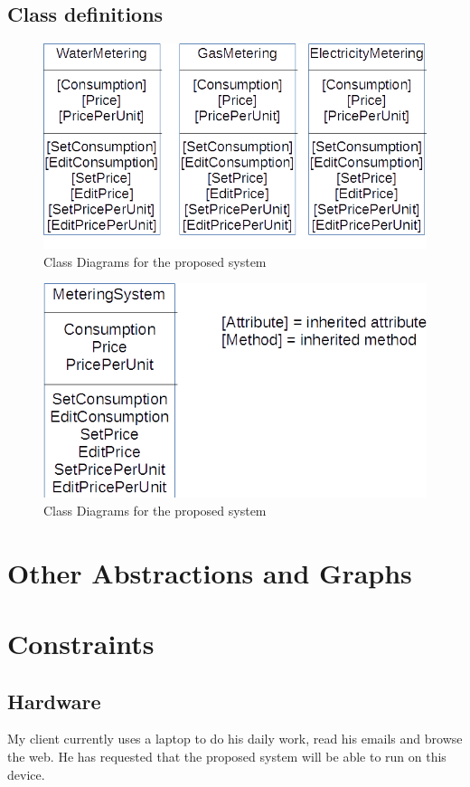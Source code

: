 \subsection{Class definitions}
\begin{figure}[H]
    \includegraphics[width=\textwidth]{./ClassDiagrams.png}
    \caption{Class Diagrams for the proposed system} \label{fig:GasMetering Class Diagram}
\end{figure}
\begin{figure}[H]
    \includegraphics[width=\textwidth]{./ClassDiagrams2.png}
    \caption{Class Diagrams for the proposed system} \label{fig:GasMetering Class Diagram}
\end{figure}
\section{Other Abstractions and Graphs}

\section{Constraints}

\subsection{Hardware}
My client currently uses a laptop to do his daily work, read his emails and browse the web. He has requested that the proposed system will be able to run on this device.

